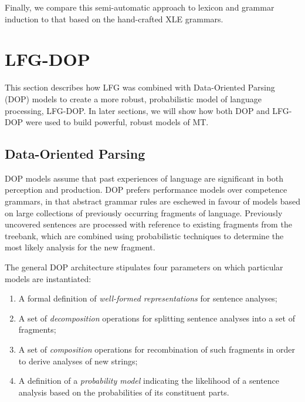 \documentclass[output=paper,hidelinks]{langscibook}
\begin{document}
Finally, we compare this semi-automatic approach to lexicon and grammar induction to that based on the hand-crafted XLE grammars. 

\section{LFG-DOP}
This section describes how LFG was combined with Data-Oriented Parsing (DOP) models to create a more robust, probabilistic model of language processing, LFG-DOP. In later sections, we will show how both DOP and LFG-DOP were used to build powerful, robust models of MT.

\subsection{Data-Oriented Parsing}
DOP models \citep{Bod92,Simaan95,Bod98} assume that past experiences of language are significant in both perception and production. DOP prefers performance models over competence grammars, in that abstract grammar rules are eschewed in favour of models based on large collections of previously occurring fragments of language.  Previously uncovered sentences are processed with reference to existing fragments from the treebank, which are combined using probabilistic techniques to determine the most likely analysis for the new fragment. 

The general DOP architecture   stipulates four
parameters on which particular models are instantiated:
\begin{enumerate}
\item A formal definition of  {\em well-formed representations} for sentence
analyses;
\item A set of {\em decomposition} operations for splitting sentence
analyses into a set of fragments;
\item A set of {\em composition} operations for recombination of  such 
fragments in order to derive analyses of new strings;
\item A definition of a {\em probability model} indicating the
likelihood of a sentence analysis based on the probabilities of its
constituent parts. 
\end{enumerate}
\end{document}
